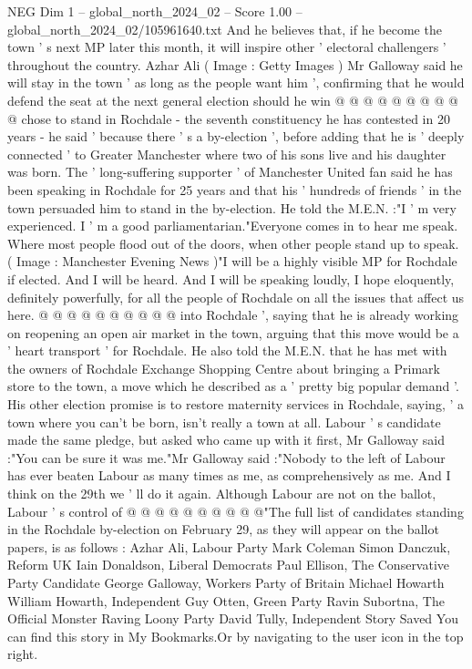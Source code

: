 \begin{textsample}{NEG Dim 1 – global\_north\_2024\_02 – Score 1.00 – global\_north\_2024\_02/105961640.txt}
And he believes that, if he become the town ' s next MP later this month, it will inspire other ' electoral challengers ' throughout the country.
Azhar Ali ( Image : Getty Images ) Mr Galloway said he will stay in the town ' as long as the people want him ', confirming that he would defend the seat at the next general election should he win @ @ @ @ @ @ @ @ @ @ chose to stand in Rochdale - the seventh constituency he has contested in 20 years - he said ' because there ' s a by-election ', before adding that he is ' deeply connected ' to Greater Manchester where two of his sons live and his daughter was born.
The ' long-suffering supporter ' of Manchester United fan said he has been speaking in Rochdale for 25 years and that his ' hundreds of friends ' in the town persuaded him to stand in the by-election.
He told the M.E.N. :"I ' m very experienced.
I ' m a good parliamentarian."Everyone comes in to hear me speak.
Where most people flood out of the doors, when other people stand up to speak. ( Image : Manchester Evening News )"I will be a highly visible MP for Rochdale if elected.
And I will be heard.
And I will be speaking loudly, I hope eloquently, definitely powerfully, for all the people of Rochdale on all the issues that affect us here. @ @ @ @ @ @ @ @ @ @ into Rochdale ', saying that he is already working on reopening an open air market in the town, arguing that this move would be a ' heart transport ' for Rochdale.
He also told the M.E.N. that he has met with the owners of Rochdale Exchange Shopping Centre about bringing a Primark store to the town, a move which he described as a ' pretty big popular demand '.
His other election promise is to restore maternity services in Rochdale, saying, ' a town where you can't be born, isn't really a town at all.
Labour ' s candidate made the same pledge, but asked who came up with it first, Mr Galloway said :"You can be sure it was me."Mr Galloway said :"Nobody to the left of Labour has ever beaten Labour as many times as me, as comprehensively as me.
And I think on the 29th we ' ll do it again.
Although Labour are not on the ballot, Labour ' s control of @ @ @ @ @ @ @ @ @ @"The full list of candidates standing in the Rochdale by-election on February 29, as they will appear on the ballot papers, is as follows : Azhar Ali, Labour Party Mark Coleman Simon Danczuk, Reform UK Iain Donaldson, Liberal Democrats Paul Ellison, The Conservative Party Candidate George Galloway, Workers Party of Britain Michael Howarth William Howarth, Independent Guy Otten, Green Party Ravin Subortna, The Official Monster Raving Loony Party David Tully, Independent Story Saved You can find this story in My Bookmarks.Or by navigating to the user icon in the top right.

\end{textsample}

